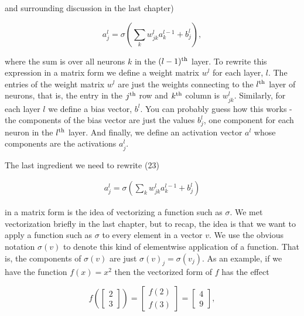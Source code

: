 \noindent and surrounding discussion in the last chapter)

\begin{equation}
a^{l}_j = \sigma\left( \sum_k w^{l}_{jk} a^{l-1}_k + b^l_j \right),
\tag{23}
\end{equation}

\noindent where the sum is over all neurons $k$ in the $(l-1)^{\rm th}$ layer. To rewrite this expression in a matrix form we define a weight matrix $w^l$ for each layer, $l$. The entries of the weight matrix $w^l$ are just the weights connecting to the $l^{\rm th}$ layer of neurons, that is, the entry in the $j^{\rm th}$ row and $k^{\rm th}$ column is $w^l_{jk}$. Similarly, for each layer $l$ we define a bias vector, $b^l$. You can probably guess how this works - the components of the bias vector are just the values $b^l_j$, one component for each neuron in the $l^{\rm th}$ layer. And finally, we define an activation vector $a^l$ whose components are the activations $a^l_j$.


The last ingredient we need to rewrite (23)

\begin{align*}
a^{l}_j = \sigma\left( \sum_k w^{l}_{jk} a^{l-1}_k + b^l_j \right) \nonumber
\end{align*}

\noindent in a matrix form is the idea of vectorizing a function such as $\sigma$. We met vectorization briefly in the last chapter, but to recap, the idea is that we want to apply a function such as $\sigma$ to every element in a vector $v$. We use the obvious notation $\sigma(v)$ to denote this kind of elementwise application of a function. That is, the components of $\sigma(v)$ are just $\sigma(v)_j = \sigma(v_j)$. As an example, if we have the function $f(x) = x^2$ then the vectorized form of $f$ has the effect

\begin{equation}
f\left(\left[ \begin{array}{c} 2 \\ 3 \end{array} \right] \right) = \left[ \begin{array}{c} f(2) \\ f(3) \end{array} \right] = \left[ \begin{array}{c} 4 \\ 9 \end{array} \right],
\tag{24}
\end{equation}

